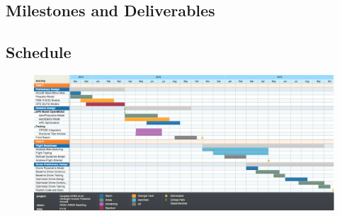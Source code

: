 \documentclass[]{aiaa-tc}
\begin{document}
    \clearpage


\begin{landscape}
\section{Milestones and Deliverables}
    \subsection{Schedule}
        \begin{figure}
            \includegraphics[width=\hsize]{images/gantt_v2}
        \end{figure}
 \end{landscape}
\end{document}
